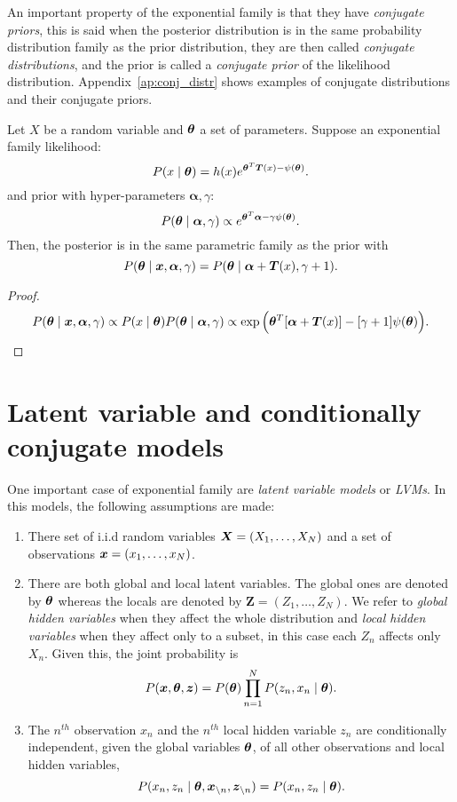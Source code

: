 An important property of the exponential family is that they have \emph{conjugate priors}, this is said when the posterior distribution is in the same probability distribution family as
the prior distribution, they are then called \emph{conjugate distributions}, and
the prior is called a \emph{conjugate prior} of the likelihood distribution. Appendix~\ref{ap:conj_distr} shows examples of conjugate distributions and their conjugate priors.

\begin{proposition}\label{prop:conj_prior}
  Let \(X\) be a random variable and \(\bm{\theta}\) a set of parameters. Suppose an exponential family likelihood:
  \[
    P(x \mid \bm{\theta}) = h(x)e^{\bm{\theta}^{T}\bm{T}(x) - \psi(\bm{\theta})}.
  \]
  and prior with hyper-parameters \(\bm{\alpha}, \gamma\):
  \[
    P(\bm{\theta} \mid \bm{\alpha}, \gamma) \propto e^{\bm{\theta}^{T} \bm{\alpha} - \gamma \psi(\bm{\theta})}.
  \]
  Then, the posterior is in the same parametric family as the prior with
  \[
    P(\bm{\theta} \mid \bm{x}, \bm{\alpha}, \gamma) = P(\bm{\theta} \mid \bm{\alpha} + \bm{T}(x), \gamma + 1).
  \]
\end{proposition}
\begin{proof}
  \[
    P(\bm{\theta} \mid \bm{x}, \bm{\alpha}, \gamma)  \propto P(x \mid \bm{\theta})P(\bm{\theta} \mid \bm{\alpha}, \gamma) \propto \exp \Big( \bm{\theta}^{T}[\bm{\alpha} + \bm{T}(x)] - [\gamma + 1]\psi(\bm{\theta}) \Big).
  \]
\end{proof}


\section{Latent variable and conditionally conjugate models}

One important case of exponential family are \emph{latent variable models} or \emph{LVMs}. In this models, the following assumptions are made:
\begin{enumerate}\itemsep0.5em
  \item There set of i.i.d random variables \(\bm{X} = (X_{1},\dots,X_{N})\) and a set of observations \(\bm{x} = (x_{1}, \dots, x_{N})\).
  \item There are both global and local latent variables. The global ones are denoted by \(\bm{\theta}\) whereas the locals are denoted by \(\bm{Z} = (Z_{1}, \dots, Z_{N})\). We refer to \emph{global hidden variables} when they affect the whole distribution and \emph{local hidden variables} when they affect only to a subset, in this case each \(Z_{n}\) affects only \(X_{n}\). Given this, the joint probability is
    \[
    P(\bm{x}, \bm{\theta}, \bm{z}) = P(\bm{\theta})\prod_{n=1}^{N}P(z_{n}, x_{n} \mid \bm{\theta}).
    \]
  \item The \(n^{th}\) observation \(x_{n}\) and the \(n^{th}\) local hidden variable \(z_{n}\) are conditionally independent, given the global variables \(\bm{\theta}\), of all other observations and local hidden variables,
    \[
    P(x_{n},z_{n} \mid \bm{\theta}, \bm{x}_{\backslash n}, \bm{z}_{\backslash n}) = P(x_{n}, z_{n} \mid \bm{\theta}).
    \]
\end{enumerate}

